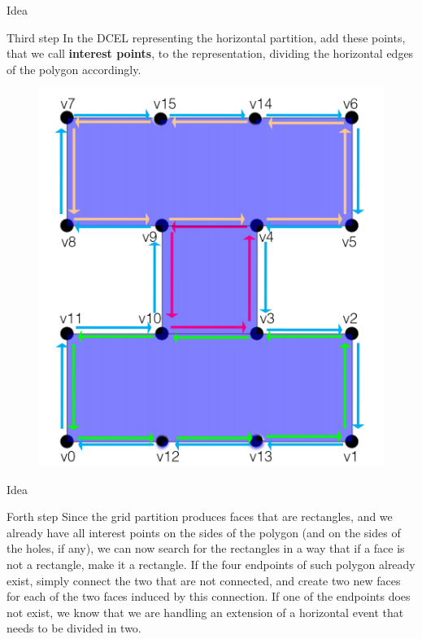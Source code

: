 \documentclass{beamer}
\begin{document}
\begin{frame}{Idea}
\begin{block}{Third step}
	In the DCEL representing the horizontal partition, add these points, that we call \textbf{interest points}, to the representation, dividing the horizontal edges of the polygon accordingly.
	
	\pause
	
	\begin{figure}
		\includegraphics[scale=0.11]{images/second}
	\end{figure}
	
\end{block}
\end{frame}

\begin{frame}{Idea}
\begin{block}{Forth step}
	Since the grid partition produces faces that are rectangles, and we already have all interest points on the sides of the polygon (and on the sides of the holes, if any), we can now search for the rectangles in a way that if a face is not a rectangle, make it a rectangle. If the four endpoints of such polygon already exist, simply connect the two that are not connected, and create two new faces for each of the two faces induced by this connection. If one of the endpoints does not exist, we know that we are handling an extension of a horizontal event that needs to be divided in two.
\end{block}
\end{frame}
\end{document}
